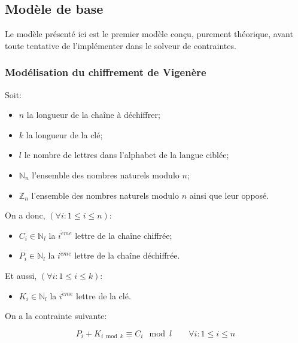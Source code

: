 \documentclass[11pt]{article}
\begin{document}
		\subsection{Modèle de base}

			Le modèle présenté ici est le premier modèle conçu, purement théorique, avant toute tentative de l'implémenter dans le solveur de contraintes.

			\subsubsection{Modélisation du chiffrement de Vigenère}

				Soit:
				\begin{itemize}
					\item $n$ la longueur de la chaîne à déchiffrer;
					\item $k$ la longueur de la clé;
					\item $l$ le nombre de lettres dans l'alphabet de la langue ciblée;
					\item $\mathbb{N}_n$ l'ensemble des nombres naturels modulo $n$;
					\item $\mathbb{Z}_n$ l'ensemble des nombres naturels modulo $n$ ainsi que leur opposé.
				\end{itemize}

				\bigskip

				On a donc, $(\forall i : 1 \leq i \leq n)$:
				\begin{itemize}
					\item $C_i \in \mathbb{N}_l$ la $i^{\grave{e}me}$ lettre de la chaîne chiffrée;
					\item $P_i \in \mathbb{N}_l$ la $i^{\grave{e}me}$ lettre de la chaîne déchiffrée.
				\end{itemize}

				\bigskip

				Et aussi, $(\forall i : 1 \leq i \leq k)$:
				\begin{itemize}
					\item $K_i \in \mathbb{N}_l$ la $i^{\grave{e}me}$ lettre de la clé.
				\end{itemize}

				\bigskip

				On a la contrainte suivante:

				\begin{equation} \label{eq:1}
				P_i + K_{i \bmod k} \equiv C_i \mod l \qquad \forall i : 1 \leq i \leq n
				\end{equation}
\end{document}

